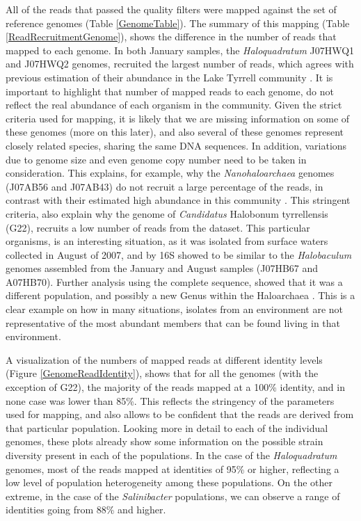All of the reads that passed the quality filters were mapped against the set of reference genomes (Table \ref{GenomeTable}). The summary of this mapping (Table \ref{ReadRecruitmentGenome}), shows the difference in the number of reads that mapped to each genome. In both January samples, the \textit{Haloquadratum} J07HWQ1 and J07HWQ2 genomes, recruited the largest number of reads, which agrees with previous estimation of their abundance in the Lake Tyrrell community \cite{Podell:2013kx}. It is important to highlight that number of mapped reads to each genome, do not reflect the real abundance of each organism in the community. Given the strict criteria used for mapping, it is likely that we are missing information on some of these genomes (more on this later), and also several of these genomes represent closely related species, sharing the same DNA sequences. In addition, variations due to genome size and even genome copy number need to be taken in consideration. This explains, for example, why the \textit{Nanohaloarchaea} genomes (J07AB56 and J07AB43) do not recruit a large percentage of the reads, in contrast with their estimated high abundance in this community \cite{Podell:2013kx}. This stringent criteria, also explain why the genome of \textit{Candidatus} Halobonum tyrrellensis (G22), recruits a low number of reads from the dataset. This particular organisms, is an interesting situation, as it was isolated from surface waters collected in August of 2007, and by 16S showed to be similar to the \textit{Halobaculum} genomes assembled from the January and August samples (J07HB67 and A07HB70). Further analysis using the complete sequence, showed that it was a different population, and possibly a new Genus within the Haloarchaea \cite{Ugalde:2013hb}. This is a clear example on how in many situations, isolates from an environment are not representative of the most abundant members that can be found living in that environment.

A visualization of the numbers of mapped reads at different identity levels (Figure \ref{GenomeReadIdentity}), shows that for all the genomes (with the exception of G22), the majority of the reads mapped at a 100\% identity, and in none case was lower than 85\%. This reflects the stringency of the parameters used for mapping, and also allows to be confident that the reads are derived from that particular population. Looking more in detail to each of the individual genomes, these plots already show some information on the possible strain diversity present in each of the populations. In the case of the \textit{Haloquadratum} genomes, most of the reads mapped at identities of 95\% or higher, reflecting a low level of population heterogeneity among these populations. On the other extreme, in the case of the \textit{Salinibacter} populations, we can observe a range of identities going from 88\% and higher. 


